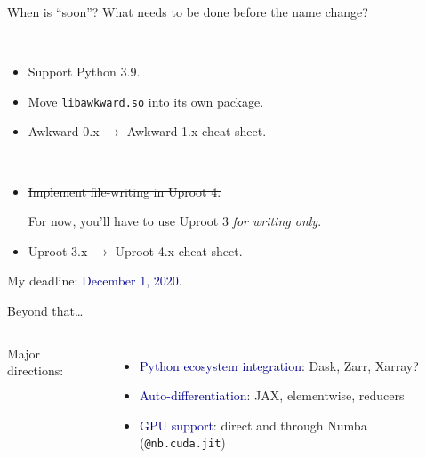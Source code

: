 \documentclass[aspectratio=169]{beamer}
\begin{document}
\begin{frame}{When is ``soon''? What needs to be done before the name change?}
\large
\vspace{0.5 cm}

\begin{description}\setlength{\itemsep}{0.5 cm}
\item[\Large Awkward Array:] \mbox{ } \\

\vspace{0.3 cm}
\begin{itemize}\setlength{\itemsep}{0.2 cm}
\item Support Python 3.9.

\item Move \texttt{libawkward.so} into its own package.

\item Awkward 0.x $\to$ Awkward 1.x cheat sheet.
\end{itemize}

\item[\Large Uproot:] \mbox{ } \\

\vspace{0.2 cm}
\begin{itemize}\setlength{\itemsep}{0.2 cm}
\item \sout{Implement file-writing in Uproot 4.}

For now, you'll have to use Uproot 3 {\it for writing only}.

\item Uproot 3.x $\to$ Uproot 4.x cheat sheet.
\end{itemize}
\end{description}

\vspace{0.65 cm}
{\Large My deadline: \textcolor{darkblue}{December 1, 2020}.}
\end{frame}

\begin{frame}{Beyond that\ldots}
\large
\vspace{0.5 cm}
\begin{columns}
{\Large Major directions:}

\vspace{0.25 cm}
\begin{itemize}\setlength{\itemsep}{0.25 cm}
\item \textcolor{darkblue}{Python ecosystem integration}: Dask, Zarr, Xarray?
\item \textcolor{darkblue}{Auto-differentiation}: JAX, elementwise, reducers
\item \textcolor{darkblue}{GPU support}: direct and through Numba (\texttt{@nb.cuda.jit})
\end{itemize}
\end{columns}
\end{frame}
\end{document}
